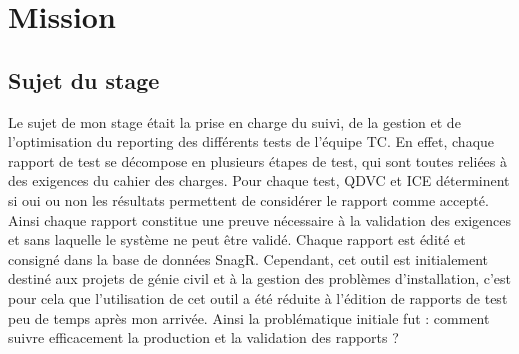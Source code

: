 \chapter{Mission}

\section{Sujet du stage}
Le sujet de mon stage était la prise en charge du suivi, de la gestion et de l'optimisation  du \gls{reporting} des différents tests de l'équipe \gls{TC}.
En effet, chaque rapport de test se décompose en plusieurs étapes de test, qui sont toutes reliées à des exigences du cahier des charges. Pour chaque test, QDVC et ICE déterminent si oui ou non les résultats permettent de considérer le rapport comme accepté. Ainsi chaque rapport constitue une preuve nécessaire à la validation des exigences et sans laquelle le système ne peut être validé.
Chaque rapport est édité et consigné dans la base de données \gls{SnagR}.
Cependant, cet outil est initialement destiné aux projets de génie civil et à la gestion des problèmes d'installation, c'est pour cela que l'utilisation de cet outil a été réduite à l'édition de rapports de test peu de temps après mon arrivée.
Ainsi la problématique initiale fut : comment suivre efficacement la production et la validation des rapports ?


